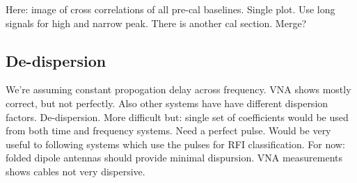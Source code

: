 Here: image of cross correlations of all pre-cal baselines. Single plot. Use long signals for high and narrow peak.
There is another cal section. Merge?

\subsection{De-dispersion}
We're assuming constant propogation delay across frequency. VNA shows mostly correct, but not perfectly. Also other systems have have different dispersion factors. 
De-dispersion. 
More difficult but: single set of coefficients would be used from both time and frequency systems. 
Need a perfect pulse.
Would be very useful to following systems which use the pulses for RFI classification. 
For now: folded dipole antennas should provide minimal dispursion. 
VNA measurements shows cables not very dispersive.
